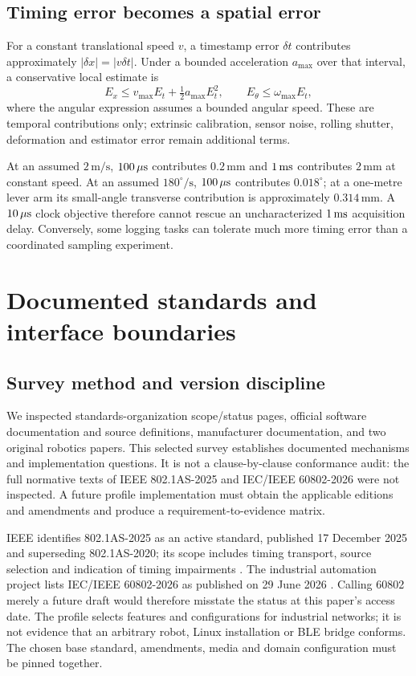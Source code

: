 \documentclass[11pt,letterpaper]{article}
\begin{document}
\subsection{Timing error becomes a spatial error}
For a constant translational speed $v$, a timestamp error $\delta t$ contributes approximately $|\delta x|=|v\delta t|$. Under a bounded acceleration $a_{\max}$ over that interval, a conservative local estimate is
\begin{equation}
 E_x \leq v_{\max}E_t+\tfrac12 a_{\max}E_t^2,
 \qquad E_\theta\leq\omega_{\max}E_t,
 \label{eq:motion}
\end{equation}
where the angular expression assumes a bounded angular speed. These are temporal contributions only; extrinsic calibration, sensor noise, rolling shutter, deformation and estimator error remain additional terms.

At an assumed $2\,\mathrm{m/s}$, $100\,\mu\mathrm{s}$ contributes $0.2\,\mathrm{mm}$ and $1\,\mathrm{ms}$ contributes $2\,\mathrm{mm}$ at constant speed. At an assumed $180^\circ/\mathrm{s}$, $100\,\mu\mathrm{s}$ contributes $0.018^\circ$; at a one-metre lever arm its small-angle transverse contribution is approximately $0.314\,\mathrm{mm}$. A $10\,\mu\mathrm{s}$ clock objective therefore cannot rescue an uncharacterized $1\,\mathrm{ms}$ acquisition delay. Conversely, some logging tasks can tolerate much more timing error than a coordinated sampling experiment.

\section{Documented standards and interface boundaries}\label{sec:survey}
\subsection{Survey method and version discipline}
We inspected standards-organization scope/status pages, official software documentation and source definitions, manufacturer documentation, and two original robotics papers. This selected survey establishes documented mechanisms and implementation questions. It is not a clause-by-clause conformance audit: the full normative texts of IEEE 802.1AS-2025 and IEC/IEEE 60802-2026 were not inspected. A future profile implementation must obtain the applicable editions and amendments and produce a requirement-to-evidence matrix.

IEEE identifies 802.1AS-2025 as an active standard, published 17 December 2025 and superseding 802.1AS-2020; its scope includes timing transport, source selection and indication of timing impairments \cite{as2025}. The industrial automation project lists IEC/IEEE 60802-2026 as published on 29 June 2026 \cite{industrial}. Calling 60802 merely a future draft would therefore misstate the status at this paper's access date. The profile selects features and configurations for industrial networks; it is not evidence that an arbitrary robot, Linux installation or BLE bridge conforms. The chosen base standard, amendments, media and domain configuration must be pinned together.
\end{document}
